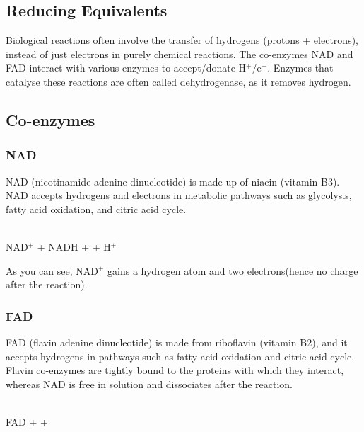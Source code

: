 \subsection{Reducing Equivalents}

\begin{center}
\end{center}
Biological reactions often involve the transfer of hydrogens (protons + electrons), instead of just electrons in purely chemical reactions.
The co-enzymes NAD and FAD interact with various enzymes to accept/donate H$^+$/e$^-$.
Enzymes that catalyse these reactions are often called dehydrogenase, as it removes hydrogen.

\subsection{Co-enzymes}

\subsubsection{NAD}

NAD (nicotinamide adenine dinucleotide) is made up of niacin (vitamin B3).
NAD accepts hydrogens and electrons in metabolic pathways such as glycolysis, fatty acid oxidation, and citric acid cycle.

\begin{center}
\\
\vspace{0.5cm}
\setatomsep{2em}
NAD$^+$ + 
\ch{<=>} NADH + 
+ H$^+$
\end{center}

As you can see, NAD$^+$ gains a hydrogen atom and two electrons(hence no charge after the reaction).

\subsubsection{FAD}

FAD (flavin adenine dinucleotide) is made from riboflavin (vitamin B2), and it accepts hydrogens in pathways such as fatty acid oxidation and citric acid cycle.
Flavin co-enzymes are tightly bound to the proteins with which they interact, whereas NAD is free in solution and dissociates after the reaction.

\begin{center}
    \\
    \vspace{0.5cm}
    \setatomsep{2em}
    FAD + 
     +
\end{center}

